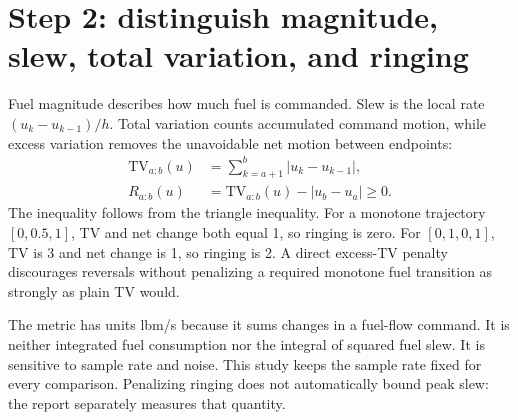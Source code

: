 \documentclass[11pt,a4paper]{article}
\begin{document}
\section{Step 2: distinguish magnitude, slew, total variation, and ringing}
Fuel magnitude describes how much fuel is commanded. Slew is the local rate $(u_k-u_{k-1})/h$. Total variation counts accumulated command motion, while excess variation removes the unavoidable net motion between endpoints:
\begin{align}
\mathrm{TV}_{a:b}(u)&=\sum_{k=a+1}^{b}|u_k-u_{k-1}|,\\
R_{a:b}(u)&=\mathrm{TV}_{a:b}(u)-|u_b-u_a|\ge0.
\end{align}
The inequality follows from the triangle inequality. For a monotone trajectory $[0,0.5,1]$, TV and net change both equal 1, so ringing is zero. For $[0,1,0,1]$, TV is 3 and net change is 1, so ringing is 2. A direct excess-TV penalty discourages reversals without penalizing a required monotone fuel transition as strongly as plain TV would.

The metric has units lbm/s because it sums changes in a fuel-flow command. It is neither integrated fuel consumption nor the integral of squared fuel slew. It is sensitive to sample rate and noise. This study keeps the sample rate fixed for every comparison. Penalizing ringing does not automatically bound peak slew: the report separately measures that quantity.
\end{document}

